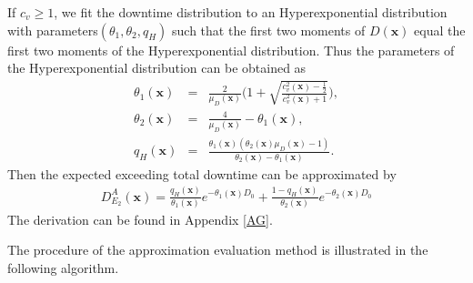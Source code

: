 \documentclass[preprint,12pt]{elsarticle}
\begin{document}
If $c_{v} \geq 1$, we fit the downtime distribution to an Hyperexponential distribution with parameters$(\theta_{1},\theta_{2}, q_{H})$ such that the first two moments of $D(\boldsymbol{x})$ equal the first two moments of the Hyperexponential distribution. Thus the parameters of the Hyperexponential distribution can be obtained as
\begin{eqnarray}
     \theta_{1}(\boldsymbol{x}) &=& \frac{2}{\mu_{D}(\boldsymbol{x})}\bigg(1+\sqrt{\frac{c^{2}_{v}(\boldsymbol{x})-\frac{1}{2}}{c^{2}_{v}(\boldsymbol{x})+1}} \bigg), \label{theta11}\\
     \theta_{2}(\boldsymbol{x}) &=& \frac{4}{\mu_{D}(\boldsymbol{x})} - \theta_{1}(\boldsymbol{x}), \label{theta12}\\
     q_{H}(\boldsymbol{x}) &=& \frac{\theta_1(\boldsymbol{x})(\theta_2(\boldsymbol{x})\mu_{D}(\boldsymbol{x})-1)}{\theta_2(\boldsymbol{x}) -\theta_1(\boldsymbol{x})}. \label{q2}
\end{eqnarray}
Then the expected exceeding total downtime can be approximated by
\begin{eqnarray}
D_{E_{2}}^{A}(\boldsymbol{x}) =\frac{q_{H}(\boldsymbol{x})}{\theta_{1}(\boldsymbol{x})} e^{-\theta_{1}(\boldsymbol{x}) D_0 } + \frac{1-q_{H}(\boldsymbol{x})}{\theta_{2}(\boldsymbol{x})} e^{-\theta_{2}(\boldsymbol{x}) D_0} \label{EXD2}
\end{eqnarray}
The derivation can be found in Appendix \ref{AG}.


The procedure of the approximation evaluation method is illustrated in the following algorithm.
\end{document}
